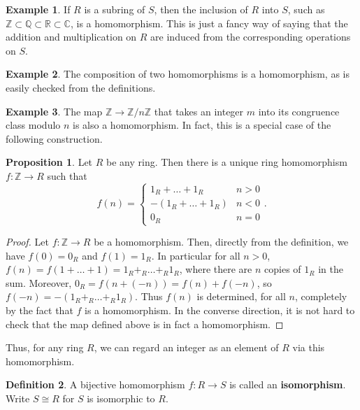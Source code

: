 \documentclass{article}
\newcommand{\Z}{\mathbb{Z}}
\newcommand{\Q}{\mathbb{Q}}
\newcommand{\R}{\mathbb{R}}
\newcommand{\C}{\mathbb{C}}
\newcommand{\rb}[1]{\left( #1 \right)}
\theoremstyle{definition}\newtheorem{definition}{Definition}[subsection]
\theoremstyle{definition}\newtheorem{remark}[definition]{Remark}
\theoremstyle{definition}\newtheorem*{example}{Example}
\theoremstyle{definition}\newtheorem*{note}{Note}
\newtheorem{proposition}[definition]{Proposition}
\begin{document}
\begin{example}
If $ R $ is a subring of $ S $, then the inclusion of $ R $ into $ S $, such as $ \Z \subset \Q \subset \R \subset \C $, is a homomorphism. This is just a fancy way of saying that the addition and multiplication on $ R $ are induced from the corresponding operations on $ S $.
\end{example}

\begin{example}
The composition of two homomorphisms is a homomorphism, as is easily checked from the definitions.
\end{example}

\begin{example}
The map $ \Z \to \Z / n\Z $ that takes an integer $ m $ into its congruence class modulo $ n $ is also a homomorphism. In fact, this is a special case of the following construction.
\end{example}

\begin{proposition}
Let $ R $ be any ring. Then there is a unique ring homomorphism $ f : \Z \to R $ such that
$$ f\rb{n} = \begin{cases} 1_R + \dots + 1_R & n > 0 \\ -\rb{1_R + \dots + 1_R} & n < 0 \\ 0_R & n = 0 \end{cases}. $$
\end{proposition}

\begin{proof}
Let $ f : \Z \to R $ be a homomorphism. Then, directly from the definition, we have $ f\rb{0} = 0_R $ and $ f\rb{1} = 1_R $. In particular for all $ n > 0 $, $ f\rb{n} = f\rb{1 + \dots + 1} = 1_R +_R \dots +_R 1_R $, where there are $ n $ copies of $ 1_R $ in the sum. Moreover, $ 0_R = f\rb{n + \rb{-n}} = f\rb{n} + f\rb{-n} $, so $ f\rb{-n} = -\rb{1_R +_R \dots +_R 1_R} $. Thus $ f\rb{n} $ is determined, for all $ n $, completely by the fact that $ f $ is a homomorphism. In the converse direction, it is not hard to check that the map defined above is in fact a homomorphism.
\end{proof}

Thus, for any ring $ R $, we can regard an integer as an element of $ R $ via this homomorphism.

\begin{definition}
A bijective homomorphism $ f : R \to S $ is called an \textbf{isomorphism}. Write $ S \cong R $ for $ S $ is isomorphic to $ R $.
\end{definition}
\end{document}
